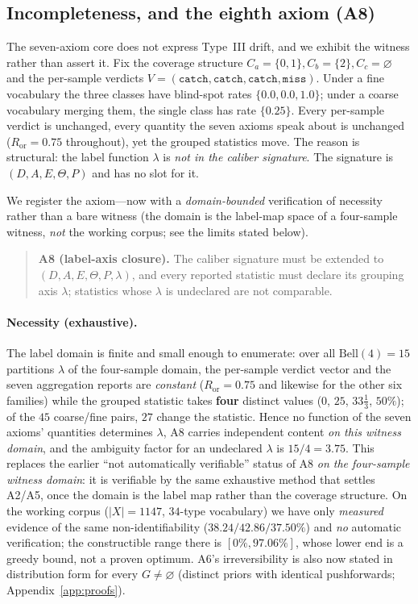 \documentclass{article}
\newcommand{\catch}{\texttt{catch}}
\newcommand{\miss}{\texttt{miss}}
\begin{document}
\subsection{Incompleteness, and the eighth axiom (A8)}
\label{sec:A8}

The seven-axiom core does not express Type~III drift, and we exhibit the witness rather than assert it. Fix
the coverage structure $C_a=\{0,1\}, C_b=\{2\}, C_c=\varnothing$ and the per-sample verdicts
$V=(\catch,\catch,\catch,\miss)$. Under a fine vocabulary the three classes have blind-spot rates
$\{0.0,0.0,1.0\}$; under a coarse vocabulary merging them, the single class has rate $\{0.25\}$. Every
per-sample verdict is unchanged, every quantity the seven axioms speak about is unchanged
($R_{\text{or}}=0.75$ throughout), yet the grouped statistics move. The reason is structural: the label
function $\lambda$ is \emph{not in the caliber signature}. The signature is $(D,A,E,\Theta,P)$ and has no slot
for it.

We register the axiom---now with a \emph{domain-bounded} verification of necessity rather than a bare witness
(the domain is the label-map space of a four-sample witness, \emph{not} the working corpus; see the limits
stated below).

\begin{quote}
\textbf{A8 (label-axis closure).} The caliber signature must be extended to $(D,A,E,\Theta,P,\lambda)$, and
every reported statistic must declare its grouping axis $\lambda$; statistics whose $\lambda$ is undeclared
are not comparable.
\end{quote}

\paragraph{Necessity (exhaustive).} The label domain is finite and small enough to enumerate: over all
$\mathrm{Bell}(4)=15$ partitions $\lambda$ of the four-sample domain, the per-sample verdict vector and the
seven aggregation reports are \emph{constant} ($R_{\text{or}}=0.75$ and likewise for the other six
families) while the grouped statistic takes \textbf{four} distinct values ($0$, $25$, $33\frac{1}{3}$,
$50\%$); of the $45$ coarse/fine pairs, $27$ change the statistic. Hence no function of the seven axioms'
quantities determines $\lambda$, A8 carries independent content \emph{on this witness domain}, and the
ambiguity factor for an undeclared $\lambda$ is $15/4=3.75$. This replaces the earlier ``not automatically
verifiable'' status of A8 \emph{on the four-sample witness domain}: it is verifiable by the same exhaustive
method that settles A2/A5, once the domain is the label map rather than the coverage structure. On the
working corpus ($|X|=1147$, $34$-type vocabulary) we have only \emph{measured} evidence of the same
non-identifiability ($38.24/42.86/37.50\%$) and \emph{no} automatic verification; the constructible range
there is $[0\%,97.06\%]$, whose lower end is a greedy bound, not a proven optimum.
A6's irreversibility is also now stated in distribution form for every $G\neq\varnothing$
(distinct priors with identical pushforwards; Appendix~\ref{app:proofs}).
\end{document}
